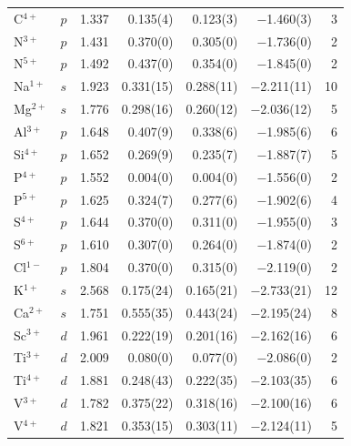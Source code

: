 \begin{longtable}{l l r r r r r}
  C$^{4+}$             & $p$   & 1.337 &       0.135(4) &       0.123(3) &    $-$1.460(3) & 3 \\
  N$^{3+}$             & $p$   & 1.431 &       0.370(0) &       0.305(0) &    $-$1.736(0) & 2 \\
  N$^{5+}$             & $p$   & 1.492 &       0.437(0) &       0.354(0) &    $-$1.845(0) & 2 \\
  Na$^{1+}$            & $s$   & 1.923 &      0.331(15) &      0.288(11) &   $-$2.211(11) & 10 \\
  Mg$^{2+}$            & $s$   & 1.776 &      0.298(16) &      0.260(12) &   $-$2.036(12) & 5 \\
  Al$^{3+}$            & $p$   & 1.648 &       0.407(9) &       0.338(6) &    $-$1.985(6) & 6 \\
  Si$^{4+}$            & $p$   & 1.652 &       0.269(9) &       0.235(7) &    $-$1.887(7) & 5 \\
  P$^{4+}$             & $p$   & 1.552 &       0.004(0) &       0.004(0) &    $-$1.556(0) & 2 \\
  P$^{5+}$             & $p$   & 1.625 &       0.324(7) &       0.277(6) &    $-$1.902(6) & 4 \\
  S$^{4+}$             & $p$   & 1.644 &       0.370(0) &       0.311(0) &    $-$1.955(0) & 3 \\
  S$^{6+}$             & $p$   & 1.610 &       0.307(0) &       0.264(0) &    $-$1.874(0) & 2 \\
  Cl$^{1-}$            & $p$   & 1.804 &       0.370(0) &       0.315(0) &    $-$2.119(0) & 2 \\
  K$^{1+}$             & $s$   & 2.568 &      0.175(24) &      0.165(21) &   $-$2.733(21) & 12 \\
  Ca$^{2+}$            & $s$   & 1.751 &      0.555(35) &      0.443(24) &   $-$2.195(24) & 8 \\
  Sc$^{3+}$            & $d$   & 1.961 &      0.222(19) &      0.201(16) &   $-$2.162(16) & 6 \\
  Ti$^{3+}$            & $d$   & 2.009 &       0.080(0) &       0.077(0) &    $-$2.086(0) & 2 \\
  Ti$^{4+}$            & $d$   & 1.881 &      0.248(43) &      0.222(35) &   $-$2.103(35) & 6 \\
  V$^{3+}$             & $d$   & 1.782 &      0.375(22) &      0.318(16) &   $-$2.100(16) & 6 \\
  V$^{4+}$             & $d$   & 1.821 &      0.353(15) &      0.303(11) &   $-$2.124(11) & 5 \\

\end{longtable}
